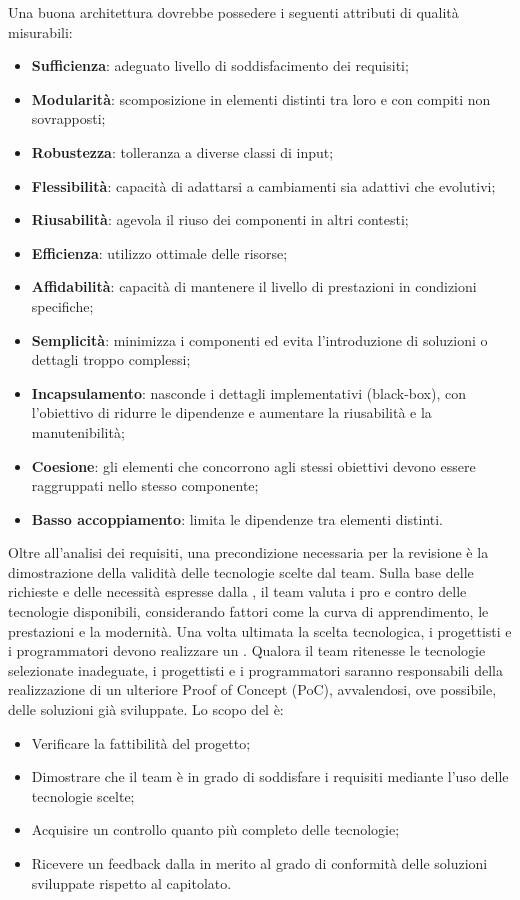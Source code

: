 \par Una buona architettura dovrebbe possedere i seguenti attributi di qualità misurabili:
\begin{itemize}
  \item \textbf{Sufficienza}: adeguato livello di soddisfacimento dei requisiti;
  \item \textbf{Modularità}: scomposizione in elementi distinti tra loro e con compiti non sovrapposti;
  \item \textbf{Robustezza}: tolleranza a diverse classi di input;
  \item \textbf{Flessibilità}: capacità di adattarsi a cambiamenti sia adattivi che evolutivi;
  \item \textbf{Riusabilità}: agevola il riuso dei componenti in altri contesti;
  \item \textbf{Efficienza}: utilizzo ottimale delle risorse;
  \item \textbf{Affidabilità}: capacità di mantenere il livello di prestazioni in condizioni specifiche;
  \item \textbf{Semplicità}: minimizza i componenti ed evita l'introduzione di soluzioni o dettagli troppo complessi;
  \item \textbf{Incapsulamento}: nasconde i dettagli implementativi (black-box), con l'obiettivo di ridurre le dipendenze e aumentare la riusabilità e la manutenibilità;
  \item \textbf{Coesione}: gli elementi che concorrono agli stessi obiettivi devono essere raggruppati nello stesso componente;
  \item \textbf{Basso accoppiamento}: limita le dipendenze tra elementi distinti.
\end{itemize}

\label{poc}
Oltre all’analisi dei requisiti, una precondizione necessaria per la revisione  è la dimostrazione della validità delle tecnologie scelte dal team. Sulla base delle richieste e delle necessità espresse dalla , il team valuta i pro e contro delle tecnologie disponibili, considerando fattori come la curva di apprendimento, le prestazioni e la modernità. Una volta ultimata la scelta tecnologica, i progettisti e i programmatori devono realizzare un . Qualora il team ritenesse le tecnologie selezionate inadeguate, i progettisti e i programmatori saranno responsabili della realizzazione di un ulteriore Proof of Concept (PoC), avvalendosi, ove possibile, delle soluzioni già sviluppate. Lo scopo del  è:
\begin{itemize}
  \item Verificare la fattibilità del progetto;
  \item Dimostrare che il team è in grado di soddisfare i requisiti mediante l'uso delle tecnologie scelte;
  \item Acquisire un controllo quanto più completo delle tecnologie;
  \item Ricevere un feedback dalla  in merito al grado di conformità delle soluzioni sviluppate rispetto al capitolato.
\end{itemize}


